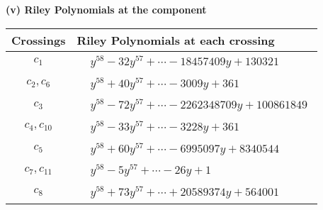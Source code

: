 \documentclass[1p]{elsarticle_modified}
\theoremstyle{definition}
\begin{document}
\newpage\renewcommand{\arraystretch}{1}
\flushleft \textbf{(v) Riley Polynomials at the component}\newline \\
\begin{tabular}{m{50pt}|m{274pt}}
Crossings & \hspace{64pt}Riley Polynomials at each crossing \\
\hline $$\begin{aligned}c_{1}\end{aligned}$$&$\begin{aligned}
&y^{58}-32 y^{57}+\cdots-18457409 y+130321
\end{aligned}$\\
\hline $$\begin{aligned}c_{2},c_{6}\end{aligned}$$&$\begin{aligned}
&y^{58}+40 y^{57}+\cdots-3009 y+361
\end{aligned}$\\
\hline $$\begin{aligned}c_{3}\end{aligned}$$&$\begin{aligned}
&y^{58}-72 y^{57}+\cdots-2262348709 y+100861849
\end{aligned}$\\
\hline $$\begin{aligned}c_{4},c_{10}\end{aligned}$$&$\begin{aligned}
&y^{58}-33 y^{57}+\cdots-3228 y+361
\end{aligned}$\\
\hline $$\begin{aligned}c_{5}\end{aligned}$$&$\begin{aligned}
&y^{58}+60 y^{57}+\cdots-6995097 y+8340544
\end{aligned}$\\
\hline $$\begin{aligned}c_{7},c_{11}\end{aligned}$$&$\begin{aligned}
&y^{58}-5 y^{57}+\cdots-26 y+1
\end{aligned}$\\
\hline $$\begin{aligned}c_{8}\end{aligned}$$&$\begin{aligned}
&y^{58}+73 y^{57}+\cdots+20589374 y+564001
\end{aligned}$\\

\end{tabular}
\end{document}

